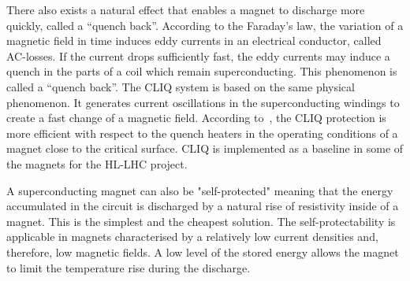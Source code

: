 There also exists a natural effect that enables a magnet to discharge more quickly, called a “quench back”. According to the Faraday’s law, the variation of a magnetic field in time induces eddy currents in an electrical conductor, called AC-losses. If the current drops sufficiently fast, the eddy currents may induce a quench in the parts of a coil which remain superconducting. This phenomenon is called a “quench back”. The CLIQ system is based on the same physical phenomenon. It generates current oscillations in the superconducting windings to create a fast change of a magnetic field. According to~\cite{ravaioli_cliq_phd_thesis}, the CLIQ protection is more efficient with respect to the quench heaters in the operating conditions of a magnet close to the critical surface. CLIQ is implemented as a baseline in some of the magnets for the HL-LHC project.

A superconducting magnet can also be "self-protected" meaning that the energy accumulated in the circuit is discharged by a natural rise of resistivity inside of a magnet. This is the simplest and the cheapest solution. The self-protectability is applicable in magnets characterised by a relatively low current densities and, therefore, low magnetic fields. A low level of the stored energy allows the magnet to limit the temperature rise during the discharge. 
